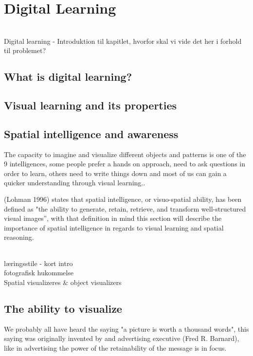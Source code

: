 \section{Digital Learning}\label{ch:digital_learning_ch}
\\Digital learning - Introduktion til kapitlet, hvorfor skal vi vide det her i forhold til problemet?
\subsection{What is digital learning?}\label{ch:what_is_digital_learning}
\subsection{Visual learning and its properties}\label{ch:visual_learning_and_its_properties}
\subsection{Spatial intelligence and awareness}\label{ch:spatial_intelligence_and_awareness}
The capacity to imagine and visualize different objects and patterns is one of the 9 intelligences, some people prefer a hands on approach, need to ask questions in order to learn, others need to write things down and most of us can gain a quicker understanding through visual learning.\cite{pracpsych2022}.

(Lohman 1996) states that spatial intelligence, or visuo-spatial ability, has been defined as "the ability to generate, retain, retrieve, and transform well-structured visual images”\cite[p97]{tapsfield1996}, with that definition in mind this section will describe the importance of spatial intelligence in regards to visual learning and spatial reasoning.

\\læringsstile - kort intro
\\fotografisk hukommelse
\\Spatial visualizeres & object visualizers

\subsection{The ability to visualize}\label{ch:the_ability_to_visualize}
We probably all have heard the saying "a picture is worth a thousand words", this saying was originally invented by and advertising executive (Fred R. Barnard)\cite{phrases2022}, like in advertising the power of the retainability of the message is in focus. 

